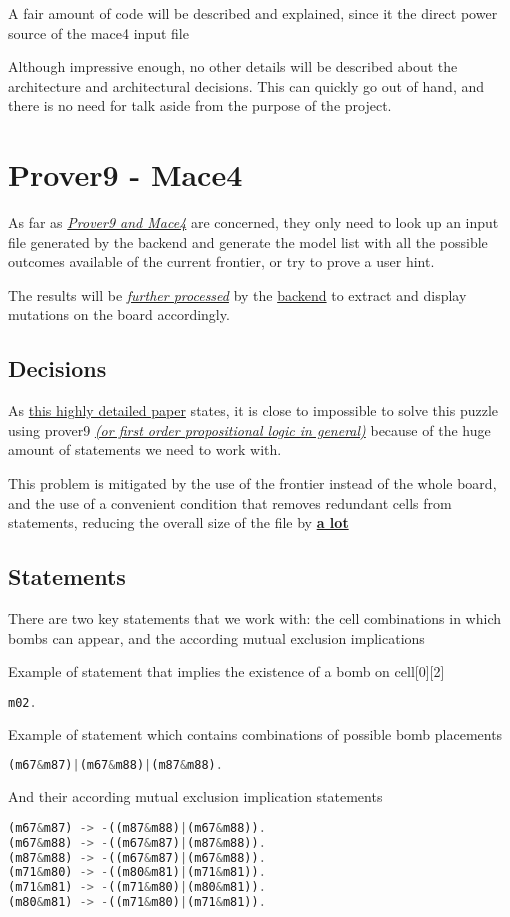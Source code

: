 \documentclass{article}
\begin{document}
        A fair amount of code will be described and explained, since it the direct power source of the mace4 input file
    
    Although impressive enough, no other details will be described about the architecture and architectural decisions. This can quickly go out of hand, and there is no need for talk aside from the purpose of the project.
    
\section{Prover9 - Mace4}
    As far as \underline{\textit{Prover9 and Mace4}} are concerned, they only need to look up an input file generated by the backend and generate the model list with all the possible outcomes available of the current frontier, or try to prove a user hint.
    
    The results will be \underline{\textit{further processed}} by the \underline{backend} to extract and display mutations on the board accordingly.
    
    \subsection{Decisions}
    As \href{https://courses.cs.duke.edu/spring06/cps102/notes/sweeper.pdf}{this highly detailed paper} states, it is close to impossible to solve this puzzle using prover9 \underline{\textit{(or first order propositional logic in general)}} because of the huge amount of statements we need to work with.
    
    This problem is mitigated by the use of the frontier instead of the whole board, and the use of a convenient condition that removes redundant cells from statements, reducing the overall size of the file by \underline{\textbf{a lot}}
    
    \subsection{Statements}
    There are two key statements that we work with: the cell combinations in which bombs can appear, and the according mutual exclusion implications
    
    Example of statement that implies the existence of a bomb on cell[0][2]
    \begin{lstlisting}[language=rust]	
m02.
    \end{lstlisting}
    
    Example of statement which contains combinations of possible bomb placements
    \begin{lstlisting}[language=rust]
(m67&m87)|(m67&m88)|(m87&m88).
    \end{lstlisting}
    And their according mutual exclusion implication statements
    \begin{lstlisting}[language=rust]
(m67&m87) -> -((m87&m88)|(m67&m88)).
(m67&m88) -> -((m67&m87)|(m87&m88)).
(m87&m88) -> -((m67&m87)|(m67&m88)).
(m71&m80) -> -((m80&m81)|(m71&m81)).
(m71&m81) -> -((m71&m80)|(m80&m81)).
(m80&m81) -> -((m71&m80)|(m71&m81)).
    \end{lstlisting}
    
\end{document}
